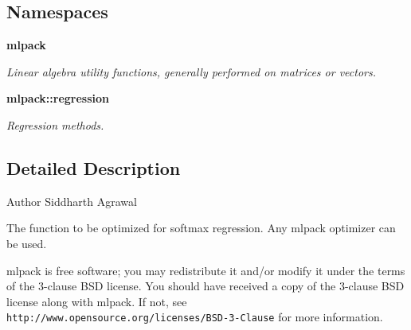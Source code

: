 \subsection*{Namespaces}
\begin{DoxyCompactItemize}
\item 
 {\bf mlpack}
\begin{DoxyCompactList}\small\item\em Linear algebra utility functions, generally performed on matrices or vectors. \end{DoxyCompactList}\item 
 {\bf mlpack\+::regression}
\begin{DoxyCompactList}\small\item\em Regression methods. \end{DoxyCompactList}\end{DoxyCompactItemize}


\subsection{Detailed Description}
\begin{DoxyAuthor}{Author}
Siddharth Agrawal
\end{DoxyAuthor}
The function to be optimized for softmax regression. Any mlpack optimizer can be used.

mlpack is free software; you may redistribute it and/or modify it under the terms of the 3-\/clause B\+SD license. You should have received a copy of the 3-\/clause B\+SD license along with mlpack. If not, see {\tt http\+://www.\+opensource.\+org/licenses/\+B\+S\+D-\/3-\/\+Clause} for more information. 